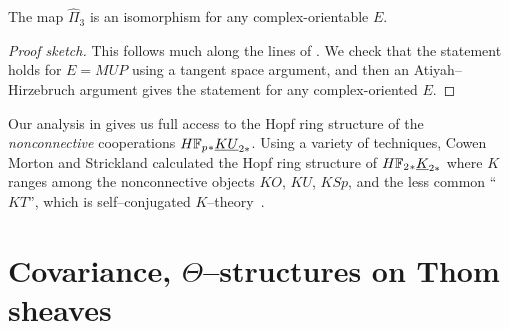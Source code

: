 \begin{corollary}\label{Pi3ForCplxOrientableE}
The map $\hat \Pi_3$ is an isomorphism for any complex-orientable $E$.
\end{corollary}
\begin{proof}[Proof sketch]
This follows much along the lines of .  We check that the statement holds for $E = MUP$ using a tangent space argument, and then an Atiyah--Hirzebruch argument gives the statement for any complex-oriented $E$.
\end{proof}

\begin{remark}
Our analysis in  gives us full access to the Hopf ring structure of the \emph{nonconnective} cooperations $H\mathbb F_p{}_* \underline{\smash{KU}}_{2*}$.  Using a variety of techniques, Cowen Morton and Strickland calculated the Hopf ring structure of $H\mathbb F_2{}_* \underline{\smash{K}}_{2*}$ where $K$ ranges among the nonconnective objects $KO$, $KU$, $KSp$, and the less common ``$KT$'', which is self--conjugated $K$--theory~\cite{CowenMortonStrickland,StricklandBottPeriodicity}.
\end{remark}







\section{Covariance, $\Theta$--structures on Thom sheaves}

